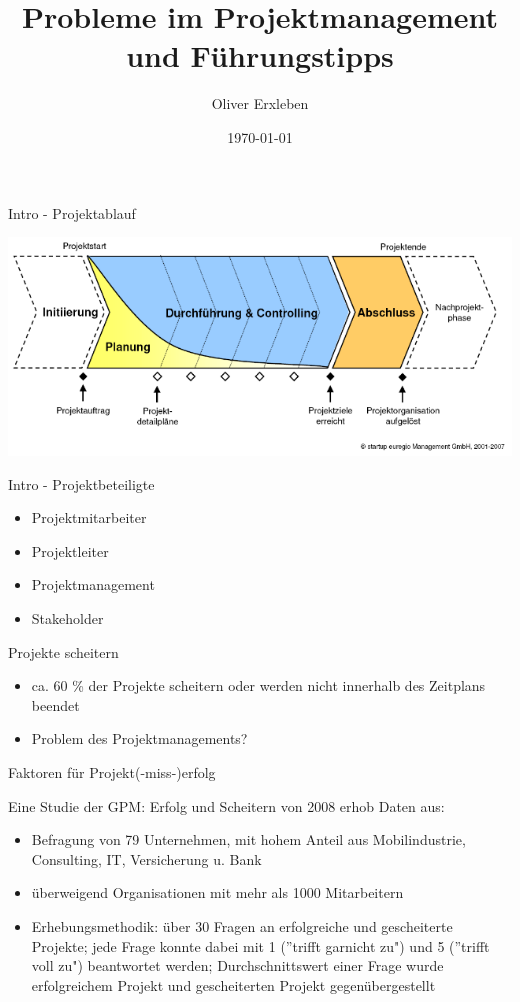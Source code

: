 \documentclass[12pt]{beamer}
\title{Probleme im Projektmanagement und Führungstipps}
\author{Oliver Erxleben}
\institute{Hochschule Osnabrück}
\date{\today}
\begin{document}
	\thispagestyle{empty}
	\frame{\titlepage}
		
	\begin{frame}{Intro - Projektablauf}
		\begin{center}
			\includegraphics[width=1.0\textwidth]{images/pm-prozess}
		\end{center}

	\end{frame}

	\begin{frame}{Intro - Projektbeteiligte}
	
		\begin{itemize}
			\item{Projektmitarbeiter}
			\item{Projektleiter}
			\item{Projektmanagement}
			\item{Stakeholder}
		\end{itemize}

	\end{frame}
	
	\begin{frame}{Projekte scheitern}
		\begin{itemize}
			\item{ca. 60 \% der Projekte scheitern oder werden nicht innerhalb des Zeitplans beendet}
			\item{Problem des Projektmanagements? }
		\end{itemize}
	\end{frame}

	\thispagestyle{empty}
	
	\begin{frame}{Faktoren für Projekt(-miss-)erfolg}
		
		Eine Studie der GPM: Erfolg und Scheitern von 2008 erhob Daten aus: 
		\begin{itemize}
			\item{Befragung von 79 Unternehmen, mit hohem Anteil aus Mobilindustrie, Consulting, IT, Versicherung u. Bank }
			\item{überweigend Organisationen mit mehr als 1000 Mitarbeitern}
			\item{Erhebungsmethodik: über 30 Fragen an erfolgreiche und gescheiterte Projekte; jede Frage konnte dabei mit 1 (''trifft garnicht zu") und 5 (''trifft voll zu") beantwortet werden; Durchschnittswert einer Frage wurde erfolgreichem Projekt und gescheiterten Projekt gegenübergestellt}
		\end{itemize}

	\end{frame}
\end{document}
